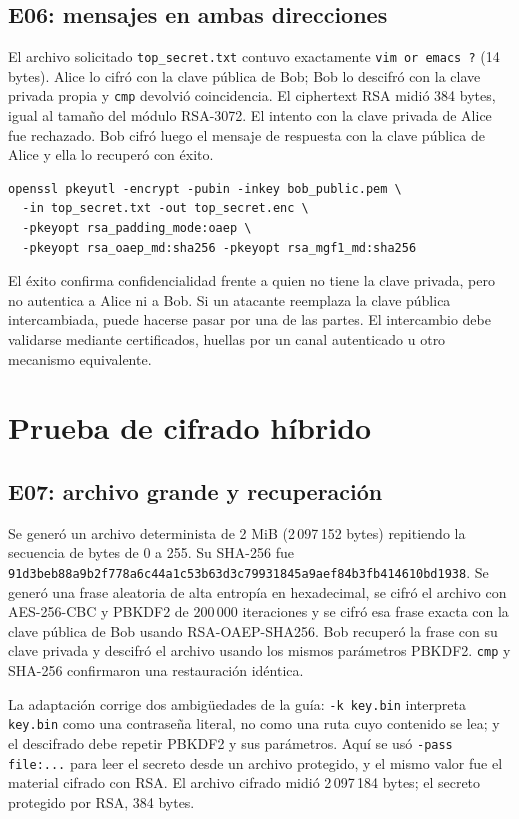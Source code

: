 \documentclass[11pt,a4paper]{article}
\begin{document}
\subsection{E06: mensajes en ambas direcciones}
El archivo solicitado \texttt{top\_secret.txt} contuvo exactamente
\texttt{vim or emacs ?} (14 bytes). Alice lo cifró con la clave pública de
Bob; Bob lo descifró con la clave privada propia y \texttt{cmp} devolvió
coincidencia. El ciphertext RSA midió 384 bytes, igual al tamaño del módulo
RSA-3072. El intento con la clave privada de Alice fue rechazado. Bob cifró
luego el mensaje de respuesta con la clave pública de Alice y ella lo recuperó
con éxito.

\begin{verbatim}
openssl pkeyutl -encrypt -pubin -inkey bob_public.pem \
  -in top_secret.txt -out top_secret.enc \
  -pkeyopt rsa_padding_mode:oaep \
  -pkeyopt rsa_oaep_md:sha256 -pkeyopt rsa_mgf1_md:sha256
\end{verbatim}

El éxito confirma confidencialidad frente a quien no tiene la clave privada,
pero no autentica a Alice ni a Bob. Si un atacante reemplaza la clave pública
intercambiada, puede hacerse pasar por una de las partes. El intercambio debe
validarse mediante certificados, huellas por un canal autenticado u otro
mecanismo equivalente.

\section{Prueba de cifrado híbrido}
\subsection{E07: archivo grande y recuperación}
Se generó un archivo determinista de 2 MiB (2\,097\,152 bytes) repitiendo la
secuencia de bytes de 0 a 255. Su SHA-256 fue
\texttt{91d3beb88a9b2f77\allowbreak 8a6c44a1c53b63d3\allowbreak c79931845a9aef84\allowbreak b3fb414610bd1938}.
Se generó una frase aleatoria de alta entropía en hexadecimal, se cifró el
archivo con AES-256-CBC y PBKDF2 de 200\,000 iteraciones y se cifró esa frase
exacta con la clave pública de Bob usando RSA-OAEP-SHA256. Bob recuperó la
frase con su clave privada y descifró el archivo usando los mismos parámetros
PBKDF2. \texttt{cmp} y SHA-256 confirmaron una restauración idéntica.

La adaptación corrige dos ambigüedades de la guía: \texttt{-k key.bin}
interpreta \texttt{key.bin} como una contraseña literal, no como una ruta cuyo
contenido se lea; y el descifrado debe repetir PBKDF2 y sus parámetros. Aquí
se usó \texttt{-pass file:...} para leer el secreto desde un archivo protegido,
y el mismo valor fue el material cifrado con RSA. El archivo cifrado midió
2\,097\,184 bytes; el secreto protegido por RSA, 384 bytes.
\end{document}
